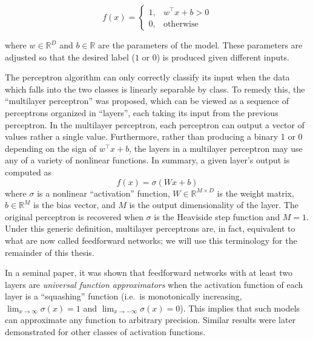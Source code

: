 \begin{equation}
f(x) = \begin{cases}
1,& w^\top x + b > 0\\
0,& \mathrm{otherwise}
\end{cases}
\end{equation}

where $w \in \mathbb{R}^D$ and $b \in \mathbb{R}$ are the parameters of the model.
These parameters are adjusted so that the desired label ($1$ or $0$) is produced given different inputs.

The perceptron algorithm can only correctly classify its input when the data which falls into the two classes is linearly separable by class.
To remedy this, the ``multilayer perceptron'' was proposed, which can be viewed as a sequence of perceptrons organized in ``layers'', each taking its input from the previous perceptron.
In the multilayer perceptron, each perceptron can output a vector of values rather a single value.
Furthermore, rather than producing a binary 1 or 0 depending on the sign of $w^\top x + b$, the layers in a multilayer perceptron may use any of a variety of nonlinear functions.
In summary, a given layer's output is computed as
\begin{equation}
f(x) = \sigma(W x + b)
\end{equation}
where $\sigma$ is a nonlinear ``activation'' function, $W \in \mathbb{R}^{M \times D}$ is the weight matrix, $b \in \mathbb{R}^M$ is the bias vector, and $M$ is the output dimensionality of the layer.
The original perceptron is recovered when $\sigma$ is the Heaviside step function and $M = 1$.
Under this generic definition, multilayer perceptrons are, in fact, equivalent to what are now called feedforward networks; we will use this terminology for the remainder of this thesis.

In a seminal paper, it was shown that feedforward networks with at least two layers are {\em universal function approximators} when the activation function of each layer is a ``squashing'' function (i.e.\ is monotonically increasing, $\lim_{x \rightarrow \infty} \sigma(x) = 1$ and $\lim_{x \rightarrow -\infty} \sigma(x) = 0$).
This implies that such models can approximate any function to arbitrary precision.
Similar results were later demonstrated for other classes of activation functions.

